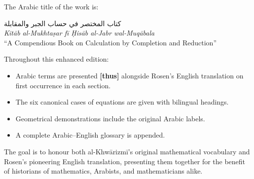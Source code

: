 \vspace{0.5cm}
\noindent The Arabic title of the work is:
\begin{center}
\Large\arabicfont\beginR كتاب المختصر في حساب الجبر والمقابلة\endR\\[0.3cm]
\textit{Kit\=ab al-Mukhta\d{s}ar f\=i \d{H}is\=ab al-Jabr wal-Muq\=abala}\\[0.2cm]
``A Compendious Book on Calculation by Completion and Reduction''
\end{center}

\vspace{0.3cm}
\noindent Throughout this enhanced edition:
\begin{itemize}[leftmargin=2em]
\item Arabic terms are presented \textbf{[\arabicfont\beginR thus\endR]} alongside Rosen's English translation on first occurrence in each section.
\item The six canonical cases of equations are given with bilingual headings.
\item Geometrical demonstrations include the original Arabic labels.
\item A complete Arabic--English glossary is appended.
\end{itemize}

\vspace{0.3cm}
\noindent The goal is to honour both al-Khw\=arizm\=i's original mathematical vocabulary and Rosen's pioneering English translation, presenting them together for the benefit of historians of mathematics, Arabists, and mathematicians alike.

\clearpage


